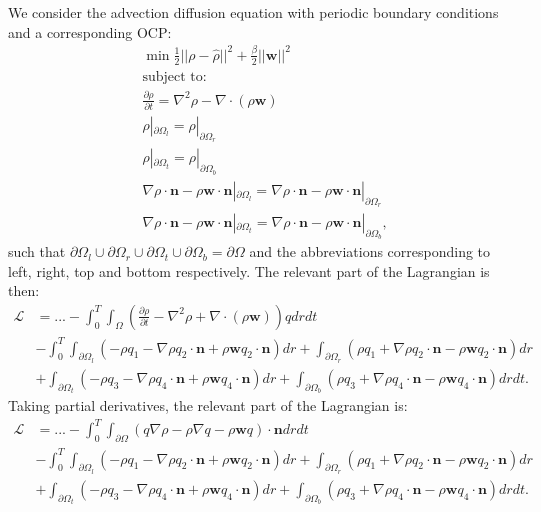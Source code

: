 \documentclass[11pt, a4paper]{article}
\theoremstyle{definition}
\newcommand{\w}{\mathbf{w}}
\newcommand{\n}{\mathbf{n}}
\newcommand{\hr}{\widehat \rho}
\begin{document}
	We consider the advection diffusion equation with periodic boundary conditions and a corresponding OCP:
	\begin{align*}
		&\min \frac{1}{2}|| \rho - \hr||^2 + \frac{\beta}{2}||\w||^2\\
		&\text{subject to:}\\
		&\frac{\partial \rho}{\partial t} = \nabla^2 \rho - \nabla \cdot (\rho \w)\\
		& \rho|_{\partial \Omega_l} = \rho|_{\partial \Omega_r}\\
		& \rho|_{\partial \Omega_t} = \rho|_{\partial \Omega_b}\\
		&\nabla \rho \cdot \n - \rho \w \cdot \n|_{\partial \Omega_l}= \nabla \rho \cdot \n  - \rho \w \cdot \n |_{\partial \Omega_r}\\
		& \nabla \rho \cdot \n - \rho \w  \cdot \n|_{\partial \Omega_t}= \nabla \rho \cdot \n  - \rho \w \cdot \n|_{\partial \Omega_b},
	\end{align*}
	such that $\partial\Omega_l \cup \partial\Omega_r \cup \partial\Omega_t \cup \partial\Omega_b = \partial \Omega$ and the abbreviations corresponding to left, right, top and bottom respectively.
	The relevant part of the Lagrangian is then:
	\begin{align*}
		\mathcal{L} &= ... -\int_0^T \int_\Omega \left(\frac{\partial \rho}{\partial t} - \nabla^2 \rho + \nabla \cdot (\rho \w) \right)q dr dt \\
		&- \int_0^T \int_{\partial \Omega_l} \left(- \rho q_1 - \nabla \rho q_2 \cdot \n  + \rho \w q_2 \cdot \n \right) dr  + \int_{\partial \Omega_r} \left(\rho q_1 + \nabla \rho q_2 \cdot \n - \rho \w q_2\cdot \n  \right)  dr  \\
		& + \int_{\partial \Omega_t} \left(- \rho q_3 - \nabla \rho q_4 \cdot \n  + \rho \w q_4 \cdot \n  \right)  dr  + \int_{\partial \Omega_b} \left(\rho q_3 + \nabla \rho q_4 \cdot \n  - \rho \w q_4  \cdot \n \right) drdt.
	\end{align*}
	Taking partial derivatives, the relevant part of the Lagrangian is:
	\begin{align*}
		\mathcal{L} &= ... - \int_0^T \int_{\partial \Omega} \left( q \nabla \rho - \rho\nabla q - \rho \w q \right) \cdot \n  dr dt\\
		&- \int_0^T \int_{\partial \Omega_l} \left(- \rho q_1 - \nabla \rho q_2\cdot \n + \rho \w q_2\cdot \n \right)   dr  + \int_{\partial \Omega_r} \left(\rho q_1 + \nabla \rho q_2 \cdot \n- \rho \w q_2\cdot \n \right)   dr  \\
		& + \int_{\partial \Omega_t} \left(- \rho q_3 - \nabla \rho q_4 \cdot \n + \rho \w q_4 \cdot \n\right) dr  + \int_{\partial \Omega_b} \left(\rho q_3 + \nabla \rho q_4 \cdot \n - \rho \w q_4 \cdot \n \right) drdt.
	\end{align*}
\end{document}
